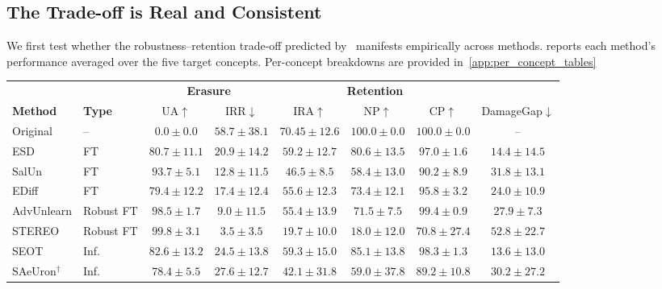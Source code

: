 \subsection{The Trade-off is Real and Consistent}
\label{subsec:tradeoff_real}
We first test whether the robustness--retention trade-off predicted by~ manifests empirically across methods.  reports each method's performance averaged over the five target concepts.
Per-concept breakdowns are provided in~\cref{app:per_concept_tables} 
\begin{table}[t]
\centering
\small
\setlength{\tabcolsep}{2.5pt}
\begin{tabular}{llcccccc}
\toprule
& & \multicolumn{2}{c}{\textbf{Erasure}} & \multicolumn{3}{c}{\textbf{Retention}} & \\
\cmidrule(lr){3-4} \cmidrule(lr){5-7}
\textbf{Method} & \textbf{Type} & UA$\uparrow$ & IRR$\downarrow$ & IRA$\uparrow$ & NP$\uparrow$ & CP$\uparrow$ & DamageGap$\downarrow$ \\
\midrule
Original    & --  & $0.0 \pm 0.0$ & $58.7 \pm 38.1$  & $70.45 \pm 12.6$  & $100.0 \pm 0.0$   & $100.0 \pm 0.0$   & -- \\
\midrule
ESD     & FT  & $80.7 \pm 11.1$  & $20.9 \pm 14.2$  & $59.2 \pm 12.7$  & $80.6 \pm 13.5$  & $97.0 \pm 1.6$  & $14.4 \pm 14.5$  \\
SalUn   & FT  & $93.7 \pm 5.1$  & $12.8 \pm 11.5$  & $46.5 \pm 8.5$  & $58.4 \pm 13.0$  & $90.2 \pm 8.9$  & $31.8 \pm 13.1$  \\
EDiff   & FT  & $79.4 \pm 12.2$  & $17.4 \pm 12.4$  & $55.6 \pm 12.3$  & $73.4 \pm 12.1$  & $95.8 \pm 3.2$  & $24.0 \pm 10.9$  \\
\midrule
AdvUnlearn & Robust FT   & $98.5 \pm 1.7$  & $9.0 \pm 11.5$   & $55.4 \pm 13.9$  & $71.5 \pm 7.5$ & $99.4 \pm 0.9$  & $27.9 \pm 7.3$  \\
STEREO  & Robust FT & $99.8 \pm 3.1$  & $3.5 \pm 3.5$   & $19.7 \pm 10.0$  & $18.0 \pm 12.0$  & $70.8 \pm 27.4$  & $52.8 \pm 22.7$  \\
\midrule
SEOT    & Inf. & $82.6 \pm 13.2$  & $24.5 \pm 13.8$  & $59.3 \pm 15.0$  & $85.1 \pm 13.8$  & $98.3 \pm 1.3$ & $13.6 \pm 13.0$  \\
SAeUron$^\dagger$ & Inf. & $78.4 \pm 5.5$ & $27.6 \pm 12.7$ & $42.1 \pm 31.8$ & $59.0 \pm 37.8$ & $89.2 \pm 10.8$ & $30.2 \pm 27.2$  \\
\bottomrule
\end{tabular}

\end{table}
